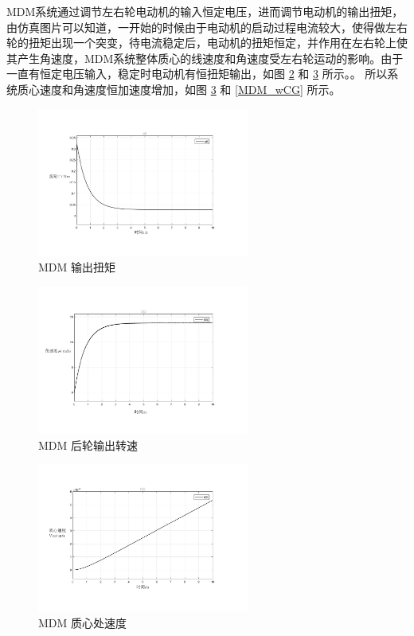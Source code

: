 \begin{itemize}
	MDM系统通过调节左右轮电动机的输入恒定电压，进而调节电动机的输出扭矩，由仿真图片可以知道，一开始的时候由于电动机的启动过程电流较大，使得做左右轮的扭矩出现一个突变，待电流稳定后，电动机的扭矩恒定，并作用在左右轮上使其产生角速度，MDM系统整体质心的线速度和角速度受左右轮运动的影响。由于一直有恒定电压输入，稳定时电动机有恒扭矩输出，如图 \ref{MDM_w_L} 和 \ref{MDM_vCG} 所示。。
	所以系统质心速度和角速度恒加速度增加，如图 \ref{MDM_vCG} 和 \ref{MDM_wCG} 所示。
	\begin{figure}[H]
		\centering
		\includegraphics[width=0.62\textwidth]{fig/simulation/MDM_T_L.pdf}
		\caption{MDM 输出扭矩}\label{MDM_T_L}
	\end{figure}
	
	\begin{figure}[H]
		\centering
		\includegraphics[width=0.62\textwidth]{fig/simulation/MDM_w_L.pdf}
		\caption{MDM 后轮输出转速}\label{MDM_w_L}
	\end{figure}
	
	\begin{figure}[H]
		\centering
		\includegraphics[width=0.62\textwidth]{fig/simulation/MDM_vCG.pdf}
		\caption{MDM 质心处速度}\label{MDM_vCG}
	\end{figure}
	

\end{itemize}
